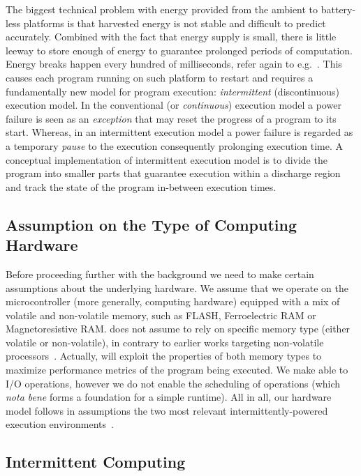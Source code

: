 The biggest technical problem with energy provided from the ambient to battery-less platforms is that harvested energy is not stable and difficult to predict accurately. Combined with the fact that energy supply is small, there is little leeway to store enough of energy to guarantee prolonged periods of computation. Energy breaks happen every hundred of milliseconds, refer again to e.g.~\cite[Fig. 1]{mementos}. This causes each program running on such platform to restart and requires a fundamentally new model for program execution:  \emph{intermittent} (discontinuous) execution model. In the conventional (or \emph{continuous}) execution model a power failure is seen as an \emph{exception} that may reset the progress of a program to its start. Whereas, in an intermittent execution model a power failure is regarded as a temporary \emph{pause} to the execution consequently prolonging execution time. A conceptual implementation of intermittent execution model is to divide the program into smaller parts that guarantee execution within a discharge region and track the state of the program in-between execution times.

\subsection{Assumption on the Type of Computing Hardware}
\label{sec:background_hardware}

Before proceeding further with the background we need to make certain assumptions about the underlying hardware. We assume that we operate on the microcontroller (more generally, computing hardware) equipped with a mix of volatile and non-volatile memory, such as FLASH, Ferroelectric RAM or Magnetoresistive RAM. \sys does not assume to rely on specific memory type (either volatile or non-volatile), in contrary to earlier works targeting non-volatile processors~\cite{su_date_2017,ratchet,quickrecall,nvp}. Actually, \sys will exploit the properties of both memory types to maximize performance metrics of the program being executed. We make \sys able to I/O operations, however we do not enable the scheduling of operations (which \emph{nota bene} forms a foundation for a simple runtime). All in all, our hardware model follows in assumptions the two most relevant intermittently-powered execution environments~\cite{alpaca,chain}.

\subsection{Intermittent Computing}
\label{sec:background_consistency}

